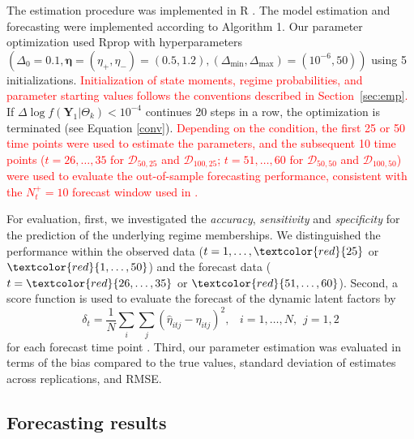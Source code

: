 The estimation procedure was implemented in R \citep{R}. The model estimation and forecasting were implemented according to Algorithm 1. Our parameter optimization used Rprop \citep{Riedmiller1993} with hyperparameters $\left( \Delta_{0}=0.1, \bm{\eta} = (\eta_{+},\eta_{-}) = (0.5, 1.2), (\Delta_{\text{min}}, \Delta_{\text{max}})=(10^{-6}, 50) \right)$ using 5 initializations. \textcolor{red}{Initialization of state moments, regime probabilities, and parameter starting values follows the conventions described in Section~\ref{sec:emp}.} If $\Delta \log f(\bm{Y}_1 | \Theta_{k}) < 10^{-4}$ continues 20 steps in a row, the optimization is terminated (see Equation \ref{conv}). \textcolor{red}{Depending on the condition, the first 25 or 50 time points were used to estimate the parameters, and the subsequent 10 time points ($t=26,\ldots,35$ for $\mathcal{D}_{50,25}$ and $\mathcal{D}_{100,25}$; $t=51,\ldots,60$ for $\mathcal{D}_{50,50}$ and $\mathcal{D}_{100,50}$) were used to evaluate the out-of-sample forecasting performance, consistent with the $N_t^{+}=10$ forecast window used in \cite{Kelava2022}.}

For evaluation, first, we investigated the \textit{accuracy}, \textit{sensitivity} and \textit{specificity} for the prediction of the underlying regime memberships. We distinguished the performance within the observed data ($t=1,\ldots,\textcolor{red}{25}$ or $\textcolor{red}{1,\ldots,50}$) and the forecast data ($t=\textcolor{red}{26,\ldots,35}$ or $\textcolor{red}{51,\ldots,60}$). Second, a score function is used to evaluate the forecast of the dynamic latent factors by
\begin{equation}
    \delta_{t} = \frac{1}{N} \sum_{i} \sum_{j} (\hat{\eta}_{itj} - \eta_{itj})^{2}, \hspace{10pt} i=1,\ldots,N,  \hspace{5pt} j=1,2
\end{equation}
for each forecast time point \citep[cf.,][]{Gneiting2011}. Third, our parameter estimation was evaluated in terms of the bias compared to the true values, standard deviation of estimates across replications, and RMSE.

\subsection{Forecasting results}

